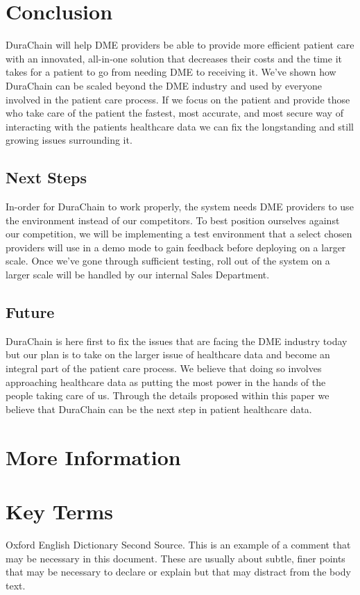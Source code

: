 \documentclass[letterpaper]{article}
\begin{document}
\section{Conclusion}
DuraChain will help DME providers be able to provide more efficient patient care with an innovated, all-in-one solution that decreases their costs and the time it takes for a patient to go from needing DME to receiving it. We’ve shown how DuraChain can be scaled beyond the DME industry and used by everyone involved in the patient care process. If we focus on the patient and provide those who take care of the patient the fastest, most accurate, and most secure way of interacting with the patients healthcare data we can fix the longstanding and still growing issues surrounding it.
%
%
\subsection{Next Steps}
In-order for DuraChain to work properly, the system needs DME providers to use the environment instead of our competitors. To best position ourselves against our competition, we will be implementing a test environment that a select chosen providers will use in a demo mode to gain feedback before deploying on a larger scale. Once we’ve gone through sufficient testing, roll out of the system on a larger scale will be handled by our internal Sales Department.
%
\subsection{Future}
DuraChain is here first to fix the issues that are facing the DME industry today but our plan is to take on the larger issue of healthcare data and become an integral part of the patient care process. We believe that doing so involves approaching healthcare data as putting the most power in the hands of the people taking care of us. Through the details proposed within this paper we believe that DuraChain can be the next step in patient healthcare data.
%
\begin{acknowledgments}
%
\end{acknowledgments}


\appendix*
\section{More Information}
%
\appendix*
\section{Key Terms}
%
\begin{thebibliography}{99}
%
 Oxford English Dictionary
%
 Second Source.
%
 This is an example of a comment that may be necessary in this
document. These are usually about subtle, finer points
that may be necessary to declare or explain but that may distract from
the body text.
%
\end{thebibliography}
\end{document}
